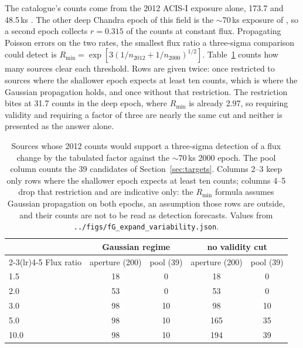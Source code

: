 \documentclass[11pt]{article}
\begin{document}
The catalogue's counts come from the 2012 ACIS-I exposure alone, 173.7 and
48.5\,ks \citep{Henleywillis2018}. The other deep Chandra epoch of this field is
the $\sim$70\,ks exposure of \citet{Haggard2009}, so a second epoch collects
$r = 0.315$ of the counts at constant flux. Propagating Poisson errors on the two
rates, the smallest flux ratio a three-sigma comparison could detect is
$R_{\min} = \exp[3(1/n_{2012} + 1/n_{2000})^{1/2}]$. Table~\ref{tab:variability}
counts how many sources clear each threshold. Rows are given twice: once
restricted to sources where the shallower epoch expects at least ten counts, which
is where the Gaussian propagation holds, and once without that restriction. The
restriction bites at 31.7 counts in the deep epoch, where $R_{\min}$ is already
2.97, so requiring validity and requiring a factor of three are nearly the same
cut and neither is presented as the answer alone.

\begin{table}[tbp]
\centering
\small
\caption{Sources whose 2012 counts would support a three-sigma detection of a flux
change by the tabulated factor against the $\sim$70\,ks 2000 epoch. The pool
column counts the 39 candidates of Section~\ref{sec:targets}. Columns 2--3 keep
only rows where the shallower epoch expects at least ten counts; columns 4--5 drop
that restriction and are indicative only: the $R_{\min}$ formula assumes Gaussian
propagation on both epochs, an assumption those rows are outside, and their counts
are not to be read as detection forecasts.
Values from \texttt{../figs/fG\_expand\_variability.json}.}
\label{tab:variability}
\begin{tabular}{lcccc}
\toprule
 & \multicolumn{2}{c}{Gaussian regime} & \multicolumn{2}{c}{no validity cut} \\
\cmidrule(lr){2-3}\cmidrule(lr){4-5}
Flux ratio & aperture (200) & pool (39) & aperture (200) & pool (39) \\
\midrule
1.5 & 18 & 0 & 18 & 0 \\
2.0 & 53 & 0 & 53 & 0 \\
3.0 & 98 & 10 & 98 & 10 \\
5.0 & 98 & 10 & 165 & 35 \\
10.0 & 98 & 10 & 194 & 39 \\
\bottomrule
\end{tabular}
\end{table}
\end{document}
